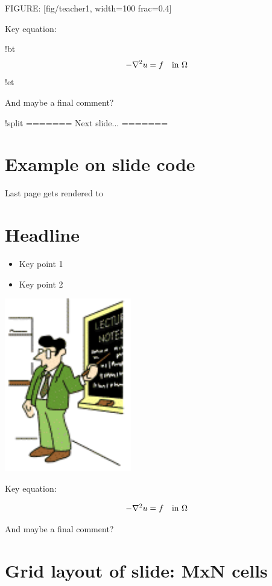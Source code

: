 \documentclass[%
twoside,                 %
draft,                   %
final,                   %
chapterprefix=true,      %
open=right               %
10pt]{book}
\begin{document}
\begin{shadedquoteBlue}
FIGURE: [fig/teacher1, width=100 frac=0.4]

Key equation:

!bt
\[ -\nabla^2 u = f \quad\hbox{in }\Omega \]
!et

And maybe a final comment?

!split
======= Next slide... =======
\eccq

\section*{Example on slide code}

Last page gets rendered to

\section*{Headline}

\begin{itemize}
 \item Key point 1

 \item Key point 2
\end{itemize}

\noindent
\begin{center}  %
  \centerline{\includegraphics[width=0.4\linewidth]{fig/teacher1.pdf}}
\end{center}


Key equation:

\[ -\nabla^2 u = f \quad\hbox{in }\Omega \]

And maybe a final comment?

\section*{Grid layout of slide: MxN cells}


\end{shadedquoteBlue}
\end{document}
